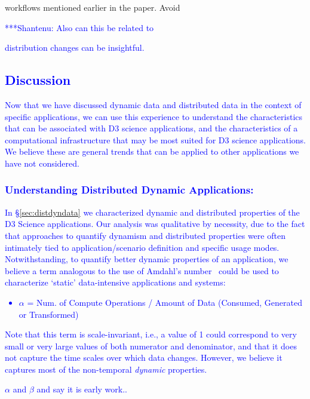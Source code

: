 \documentclass[times]{cpeauth}
\newcommand{\jhanote}[1]{ {\textcolor{blue} { ***Shantenu: #1 }}}
\newcommand{\rananote}[1]{} \newcommand{\note}[1]{} \newcommand{\jhanote}[1]{}
\begin{document}
workflows mentioned earlier in the paper. Avoid %
\jhanote{Also can this be related to %



distribution changes can be insightful.

\subsection{Discussion}
\label{sec:discussion}

Now that we have discussed dynamic data and distributed data in the context of
specific applications, we can use this experience to understand the
characteristics that can be associated with D3 science applications, and the
characteristics of a computational infrastructure that may be most suited for D3
science applications.  We believe these are general trends that can be applied
to other applications we have not considered.


\subsubsection{Understanding Distributed Dynamic Applications: }
\label{sec:quantifyingdistapps}

In \S\ref{sec:distdyndata} we characterized dynamic and distributed properties
of the D3 Science applications. Our analysis was qualitative by necessity, due
to the fact that approaches to quantify dynamism and distributed properties were
often intimately tied to application/scenario definition and specific usage
modes.  Notwithstanding, to quantify better dynamic properties of an
application, we believe a term analogous to the use of Amdahl's
number~\cite{10.1109/ICDE.2000.839382} could be used to characterize `static'
data-intensive applications and systems:

\begin{itemize}
\item[] $\alpha$ = Num. of Compute Operations / Amount of Data (Consumed,
Generated or Transformed)
\end{itemize}

Note that this term is scale-invariant, i.e., a value of 1 could correspond to
very small or very large values of both numerator and denominator, and that it
does not capture the time scales over which data changes. However, we believe it
captures most of the non-temporal {\it dynamic} properties.

$\alpha$ and $\beta$ and say it is early work..}
\end{document}
